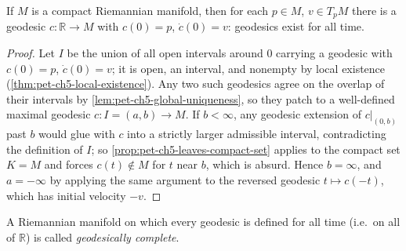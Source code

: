 \begin{corollary}
  \label{cor:pet-ch5-compact-manifold-complete}
  \leanok
  If $M$ is a compact Riemannian manifold, then for each $p\in M$, $v\in T_pM$
  there is a geodesic $c:\mathbb R\to M$ with $c(0)=p$, $\dot c(0)=v$: geodesics exist
  for all time.
\end{corollary}
\begin{proof}
  Let $I$ be the union of all open intervals around $0$ carrying a geodesic with
  $c(0)=p$, $\dot c(0)=v$; it is open, an interval, and nonempty by local existence
  (\cref{thm:pet-ch5-local-existence}). Any two such geodesics agree on the overlap
  of their intervals by \cref{lem:pet-ch5-global-uniqueness}, so they patch to a
  well-defined maximal geodesic $c:I=(a,b)\to M$. If $b<\infty$, any geodesic
  extension of $c|_{(0,b)}$ past $b$ would glue with $c$ into a strictly larger
  admissible interval, contradicting the definition of $I$; so
  \cref{prop:pet-ch5-leaves-compact-set} applies to the compact set $K=M$ and forces
  $c(t)\notin M$ for $t$ near $b$, which is absurd. Hence $b=\infty$, and $a=-\infty$
  by applying the same argument to the reversed geodesic $t\mapsto c(-t)$, which has
  initial velocity $-v$.
\end{proof}

\begin{definition}
  \label{def:pet-ch5-geodesically-complete}
  \leanok
  A Riemannian manifold on which every geodesic is defined for all time (i.e.\ on
  all of $\mathbb R$) is called \emph{geodesically complete}.
\end{definition}


